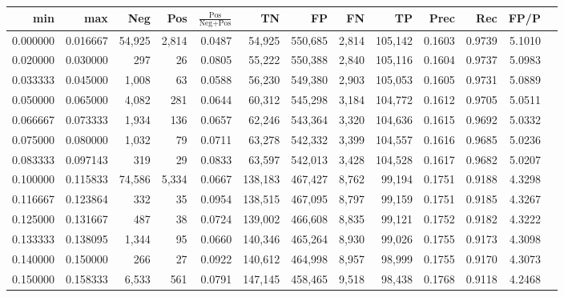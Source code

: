 \begin{tabular}{rrrrrrrrrrrrr}
\toprule
     min &      max &    Neg &    Pos & $\frac{\text{Pos}}{\text{Neg}+\text{Pos}}$ &      TN &      FP &      FN &      TP &   Prec &    Rec &   FP/P \\
\midrule
0.000000 & 0.016667 & 54,925 &  2,814 &                                     0.0487 &  54,925 & 550,685 &   2,814 & 105,142 & 0.1603 & 0.9739 & 5.1010 \\
0.020000 & 0.030000 &    297 &     26 &                                     0.0805 &  55,222 & 550,388 &   2,840 & 105,116 & 0.1604 & 0.9737 & 5.0983 \\
0.033333 & 0.045000 &  1,008 &     63 &                                     0.0588 &  56,230 & 549,380 &   2,903 & 105,053 & 0.1605 & 0.9731 & 5.0889 \\
0.050000 & 0.065000 &  4,082 &    281 &                                     0.0644 &  60,312 & 545,298 &   3,184 & 104,772 & 0.1612 & 0.9705 & 5.0511 \\
0.066667 & 0.073333 &  1,934 &    136 &                                     0.0657 &  62,246 & 543,364 &   3,320 & 104,636 & 0.1615 & 0.9692 & 5.0332 \\
0.075000 & 0.080000 &  1,032 &     79 &                                     0.0711 &  63,278 & 542,332 &   3,399 & 104,557 & 0.1616 & 0.9685 & 5.0236 \\
0.083333 & 0.097143 &    319 &     29 &                                     0.0833 &  63,597 & 542,013 &   3,428 & 104,528 & 0.1617 & 0.9682 & 5.0207 \\
0.100000 & 0.115833 & 74,586 &  5,334 &                                     0.0667 & 138,183 & 467,427 &   8,762 &  99,194 & 0.1751 & 0.9188 & 4.3298 \\
0.116667 & 0.123864 &    332 &     35 &                                     0.0954 & 138,515 & 467,095 &   8,797 &  99,159 & 0.1751 & 0.9185 & 4.3267 \\
0.125000 & 0.131667 &    487 &     38 &                                     0.0724 & 139,002 & 466,608 &   8,835 &  99,121 & 0.1752 & 0.9182 & 4.3222 \\
0.133333 & 0.138095 &  1,344 &     95 &                                     0.0660 & 140,346 & 465,264 &   8,930 &  99,026 & 0.1755 & 0.9173 & 4.3098 \\
0.140000 & 0.150000 &    266 &     27 &                                     0.0922 & 140,612 & 464,998 &   8,957 &  98,999 & 0.1755 & 0.9170 & 4.3073 \\
0.150000 & 0.158333 &  6,533 &    561 &                                     0.0791 & 147,145 & 458,465 &   9,518 &  98,438 & 0.1768 & 0.9118 & 4.2468 \\

\end{tabular}
